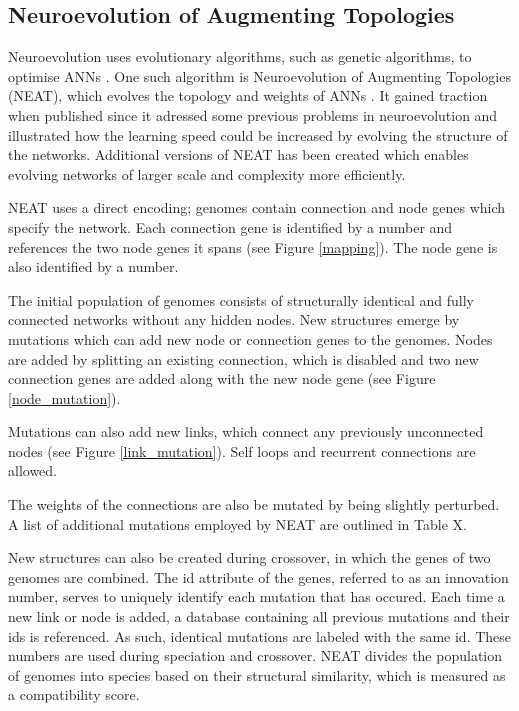 \newpage

\subsection{Neuroevolution of Augmenting Topologies}
Neuroevolution uses evolutionary algorithms, such as genetic algorithms, to optimise ANNs \cite{neuroevolution_review}.
One such algorithm is Neuroevolution of Augmenting Topologies (NEAT), which evolves the topology and weights of ANNs \cite{neat_main, neat_short, neat_phd}.
It gained traction when published since it adressed some previous problems in neuroevolution and illustrated how the learning speed could
be increased by evolving the structure of the networks. Additional versions of NEAT has been created which enables evolving networks
of larger scale and complexity more efficiently.

NEAT uses a direct encoding; genomes contain connection and node genes which specify the network. Each connection gene is identified
by a number and references the two node genes it spans (see Figure \ref{mapping}). The node gene is also identified by a number.



The initial population of genomes consists of structurally identical and fully connected networks without any hidden nodes.
New structures emerge by mutations which can add new node or connection genes to the genomes. Nodes are added by splitting an existing
connection, which is disabled and two new connection genes are added along with the new node gene (see Figure \ref{node_mutation}).



Mutations can also add new links, which connect any previously unconnected nodes (see Figure \ref{link_mutation}).
Self loops and recurrent connections are allowed.

The weights of the connections are also be mutated by being slightly perturbed. A list of additional mutations employed by NEAT are outlined in Table X.



New structures can also be created during crossover, in which the genes of two genomes are combined.
The id attribute of the genes, referred to as an innovation number, serves to uniquely identify each mutation that has occured.
Each time a new link or node is added, a database containing all previous mutations and their ids is referenced.
As such, identical mutations are labeled with the same id.
These numbers are used during speciation and crossover. NEAT divides the population of genomes into species based on their structural
similarity, which is measured as a compatibility score.




